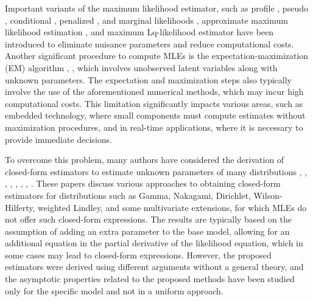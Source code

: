 \documentclass[10pt,a4paper,onecolumn]{article} %
\begin{document}
Important variants of the maximum likelihood estimator, such as profile \cite{murphy2000profile}, pseudo \cite{gourieroux1984pseudo}, conditional \cite{andersen1970asymptotic}, penalized \cite{anderson1982penalized}, \cite{firth1993bias} and marginal likelihoods \cite{cox1975partial}, approximate maximum likelihood estimation \cite{panigrahi2023approximate}, and maximum Lq-likelihood estimator \cite{ferrari2010maximum} have been introduced to eliminate nuisance parameters and reduce computational costs. Another significant procedure to compute MLEs is the expectation-maximization (EM) algorithm \cite{dempster1977maximum}, \cite{ng2013recent}, which involves unobserved latent variables along with unknown parameters. The expectation and maximization steps also typically involve the use of the aforementioned numerical methods, which may incur high computational costs. This limitation significantly impacts various areas, such as embedded technology, where small components must compute estimates without maximization procedures, and in real-time applications, where it is necessary to provide immediate decisions.

To overcome this problem, many authors have considered the derivation of closed-form estimators to estimate unknown parameters of many distributions \cite{ho2023asymptotically}, \cite{louzada2018inverse}, \cite{louzada2019note}, 
\cite{nawa2023closed}, \cite{ramos2019improved}, \cite{ramos2020bias}, 
\cite{ye2017closed}, \cite{zhao2022closed}. These papers discuss various approaches to obtaining closed-form estimators for distributions such as Gamma, Nakagami, Dirichlet, Wilson-Hilferty, weighted Lindley, and some multivariate extensions, for which MLEs do not offer such closed-form expressions. The results are typically based on the assumption of adding an extra parameter to the base model, allowing for an additional equation in the partial derivative of the likelihood equation, which in some cases may lead to closed-form expressions. However, the proposed estimators were derived using different arguments without a general theory, and the asymptotic properties related to the proposed methods have been studied only for the specific model and not in a uniform approach. 

\end{document}
